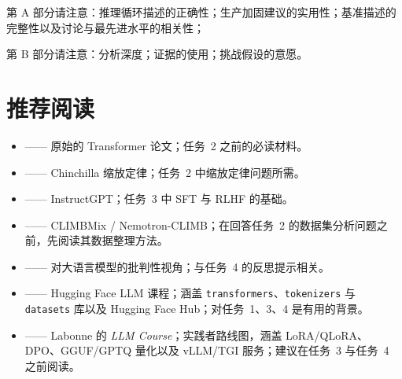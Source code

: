 
第 A 部分请注意：推理循环描述的正确性；生产加固建议的实用性；基准描述的完整性以及讨论与最先进水平的相关性；

第 B 部分请注意：分析深度；证据的使用；挑战假设的意愿。



\section{推荐阅读}
\label{sec:reading}

\begin{itemize}
    \item \citet{vaswani2017attention} —— 原始的 Transformer 论文；任务~2 之前的必读材料。
    \item \citet{10.5555/3600270.3602446} —— Chinchilla 缩放定律；任务~2 中缩放定律问题所需。
    \item \citet{ouyang2022training} —— InstructGPT；任务~3 中 SFT 与 RLHF 的基础。
    \item \citet{diao2026nemotron} —— CLIMBMix / Nemotron-CLIMB；在回答任务~2 的数据集分析问题之前，先阅读其数据整理方法。
    \item \citet{bender2021dangers} —— 对大语言模型的批判性视角；与任务~4 的反思提示相关。
    \item \citet{huggingface2022course} —— Hugging Face LLM 课程；涵盖 \texttt{transformers}、\texttt{tokenizers} 与 \texttt{datasets} 库以及 Hugging Face Hub；对任务~1、3、4 是有用的背景。
    \item \citet{labonne2023llmcourse} —— Labonne 的 \textit{LLM Course}；实践者路线图，涵盖 LoRA/QLoRA、DPO、GGUF/GPTQ 量化以及 vLLM/TGI 服务；建议在任务~3 与任务~4 之前阅读。
\end{itemize}



